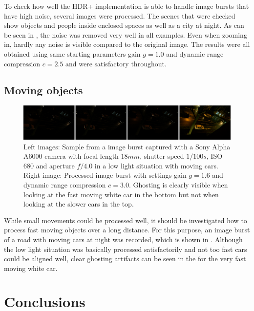 \documentclass{egpubl}
\begin{document}
To check how well the HDR+ implementation is able to handle image bursts that have high noise, several 
images were processed. The scenes that were checked show objects and people inside enclosed 
spaces as well as a city at night. As can be seen in , the noise was 
removed very well in all examples. Even when zooming in, hardly any noise is visible 
compared to the original image. The results were all obtained using same starting 
parameters gain $g=1.0$ and dynamic range compression $c=2.5$ and were satisfactory throughout.

\subsection{Moving objects}
\label{sec:moving}

\begin{figure}
      \hspace{\fill}
      \includegraphics[width=0.9\linewidth]{images/moving_burst.png}
      \hspace{\fill}
      \centering
      \caption{
            Left images: Sample from a image burst captured with a Sony Alpha A6000 camera
            with focal length $18mm$, shutter speed $1/100s$, ISO $680$ 
            and aperture $f/4.0$ in a low light situation with moving cars.
            Right image: Processed image burst with settings gain $g = 1.6$ and dynamic 
            range compression $c = 3.0$. Ghosting is clearly visible when looking at the 
            fast moving white car in the bottom but not when looking at the slower cars
            in the top.
      }
      \label{fig:moving}
\end{figure}

While small movements could be processed well, it should be investigated how to 
process fast moving objects over a long distance. For this purpose, an image burst 
of a road with moving cars at night was recorded, which is shown in . 
Although the low light situation was basically processed satisfactorily and not 
too fast cars could be aligned well, clear ghosting artifacts can be seen in the 
for the very fast moving white car.

\section{Conclusions}
\label{sec:conclusion}
\end{document}
